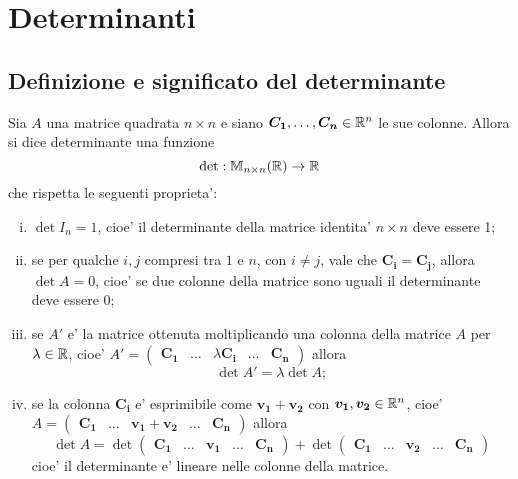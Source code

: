 
\chapter{Determinanti}

\section{Definizione e significato del determinante}

\begin{definition}
    Sia $A$ una matrice quadrata $n \times n$ e siano $\bm{C_1}, \dots, \bm{C_n} \in \mathbb{R}^n$ le sue colonne. Allora si dice determinante una funzione \[
        \det : \mathbb{M}_{n \times n}(\mathbb{R}) \to \mathbb{R} 
    \] che rispetta le seguenti proprieta':

    \begin{enumerate}[(i)]
        \item $\det I_n = 1$, cioe' il determinante della matrice identita' $n \times n$ deve essere 1;
        \item se per qualche $i, j$ compresi tra $1$ e $n$, con $i \neq j$, vale che $\bm{C_i} = \bm{C_j}$, allora $\det A = 0$, cioe' se due colonne della matrice sono uguali il determinante deve essere 0;
        \item se $A'$ e' la matrice ottenuta moltiplicando una colonna della matrice $A$ per $\lambda \in \mathbb{R}$, cioe' $A' = \begin{pmatrix} \bm{C_1} & \dots & \lambda \bm{C_i} & \dots & \bm{C_n} \end{pmatrix}$ allora \[\det A' = \lambda \det A;\]
        \item se la colonna $\bm{C_i}$ e' esprimibile come $\bm{v_1} + \bm{v_2}$ con $\bm{v_1}, \bm{v_2} \in \mathbb{R}^n$, cioe' $A = \begin{pmatrix} \bm{C_1} & \dots & \bm{v_1} + \bm{v_2} & \dots & \bm{C_n} \end{pmatrix}$
        allora \[
            \det A = \det \begin{pmatrix} \bm{C_1} & \dots & \bm{v_1} & \dots & \bm{C_n} \end{pmatrix} + \det \begin{pmatrix} \bm{C_1} & \dots & \bm{v_2} & \dots & \bm{C_n} \end{pmatrix} 
        \] cioe' il determinante e' lineare nelle colonne della matrice.
    \end{enumerate}
\end{definition}

